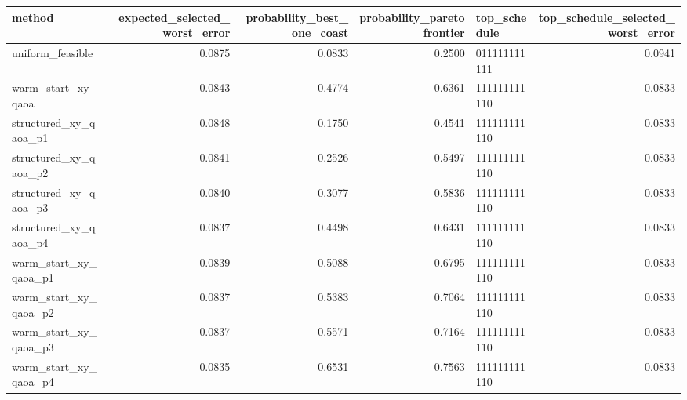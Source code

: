 \begin{tabular}{lrrrlr}
\toprule
method & expected\_selected\_worst\_error & probability\_best\_one\_coast & probability\_pareto\_frontier & top\_schedule & top\_schedule\_selected\_worst\_error \\
\midrule
uniform\_feasible & 0.0875 & 0.0833 & 0.2500 & 011111111111 & 0.0941 \\
warm\_start\_xy\_qaoa & 0.0843 & 0.4774 & 0.6361 & 111111111110 & 0.0833 \\
structured\_xy\_qaoa\_p1 & 0.0848 & 0.1750 & 0.4541 & 111111111110 & 0.0833 \\
structured\_xy\_qaoa\_p2 & 0.0841 & 0.2526 & 0.5497 & 111111111110 & 0.0833 \\
structured\_xy\_qaoa\_p3 & 0.0840 & 0.3077 & 0.5836 & 111111111110 & 0.0833 \\
structured\_xy\_qaoa\_p4 & 0.0837 & 0.4498 & 0.6431 & 111111111110 & 0.0833 \\
warm\_start\_xy\_qaoa\_p1 & 0.0839 & 0.5088 & 0.6795 & 111111111110 & 0.0833 \\
warm\_start\_xy\_qaoa\_p2 & 0.0837 & 0.5383 & 0.7064 & 111111111110 & 0.0833 \\
warm\_start\_xy\_qaoa\_p3 & 0.0837 & 0.5571 & 0.7164 & 111111111110 & 0.0833 \\
warm\_start\_xy\_qaoa\_p4 & 0.0835 & 0.6531 & 0.7563 & 111111111110 & 0.0833 \\
\bottomrule
\end{tabular}
